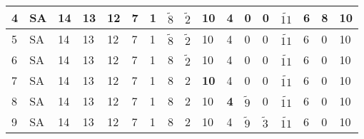 \begin{table}
{\begin{tabular}{l|l|lllllllllllllll}
			4       & SA & 14          & 13                                  & 12                                  & 7          & \textbf{1} & $\widetilde{8}$           & $\widetilde{2}$           & 10          & 4          & 0                                       & 0                                       & $\widetilde{11}$                         & \cellcolor[HTML]{32CB00}6 & 8                         & 10                        \\ \hline
			5       & SA & 14          & 13                                  & 12                                  & 7          & 1          & \textbf{$\widetilde{8}$}  & $\widetilde{2}$           & 10          & 4          & 0                                       & 0                                       & $\widetilde{11}$                         & 6                         & \cellcolor[HTML]{32CB00}0 & 10                        \\ \hline
			6       & SA & 14          & 13                                  & 12                                  & 7          & 1          & \cellcolor[HTML]{3166FF}8 & \textbf{$\widetilde{2}$}  & 10          & 4          & 0                                       & 0                                       & $\widetilde{11}$                         & 6                         & 0                         & 10                        \\ \hline
			7       & SA & 14          & 13                                  & 12                                  & 7          & 1          & 8                         & \cellcolor[HTML]{3166FF}2 & \textbf{10} & 4          & 0                                       & 0                                       & $\widetilde{11}$                         & 6                         & 0                         & 10                        \\ \hline
			8       & SA & 14          & 13                                  & 12                                  & 7          & 1          & 8                         & 2                         & 10          & \textbf{4} & \cellcolor[HTML]{32CB00}$\widetilde{9}$ & 0                                       & $\widetilde{11}$                         & 6                         & 0                         & 10                        \\ \hline
			9       & SA & 14          & 13                                  & 12                                  & 7          & 1          & 8                         & 2                         & 10          & 4          & \textbf{$\widetilde{9}$}                & \cellcolor[HTML]{32CB00}$\widetilde{3}$ & $\widetilde{11}$                         & 6                         & 0                         & 10                        \\ \hline

\end{tabular}}
\end{table}
